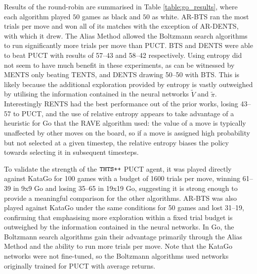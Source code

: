     Results of the round-robin are summarised in Table \ref{table:go_results}, where each algorithm played $50$ games as black and $50$ as white. AR-BTS ran the most trials per move and won all of its matches with the exception of AR-DENTS, with which it drew. The Alias Method allowed the Boltzmann search algorithms to run significantly more trials per move than PUCT. BTS and DENTS were able to beat PUCT with results of 57--43 and 58--42 respectively. Using entropy did not seem to have much benefit in these experiments, as can be witnessed by MENTS only beating TENTS, and DENTS drawing 50--50 with BTS. This is likely because the additional exploration provided by entropy is vastly outweighed by utilising the information contained in the neural networks $\tilde{V}$ and $\tilde{\pi}$. Interestingly RENTS had the best performance out of the prior works, losing 43--57 to PUCT, and the use of relative entropy appears to take advantage of a heuristic for Go that the RAVE \cite{rave} algorithm used: the value of a move is typically unaffected by other moves 
    on the board, so if a move is assigned high probability but 
    not selected at a given timestep, the relative entropy 
    biases the policy towards selecting it in subsequent 
    timesteps.

    To validate the strength of the ${\textnormal{\texttt{THTS++}}}$ PUCT agent, 
    it was played directly against KataGo \cite{katago} for 100 games with 
    a budget of 1600 trials per move, winning 61--39 in 9x9 
    Go and losing 35--65 in 19x19 Go, suggesting it is strong 
    enough to provide a meaningful comparison for the other 
    algorithms. AR-BTS was also played against KataGo under 
    the same conditions for 50 games and lost 31--19, 
    confirming that emphasising more exploration within a fixed trial budget is outweighed by the information contained in the neural networks. In Go, the Boltzmann 
    search algorithms gain their advantage primarily through 
    the Alias Method and the ability to run more trials per 
    move. Note that the KataGo networks were not fine-tuned, 
    so the Boltzmann algorithms used networks originally 
    trained for PUCT with average returns.
    


    

    
    





































